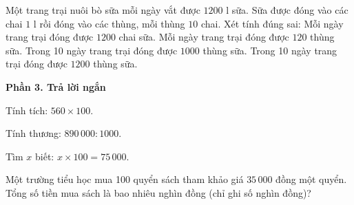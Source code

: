 \begin{ex} %
Một trang trại nuôi bò sữa mỗi ngày vắt được $1200\text{ l}$ sữa. Sữa được đóng vào các chai $1\text{ l}$ rồi đóng vào các thùng, mỗi thùng $10$ chai. Xét tính đúng sai:
\choiceTF
{\True Mỗi ngày trang trại đóng được $1200$ chai sữa.}
{\True Mỗi ngày trang trại đóng được $120$ thùng sữa.}
{Trong 10 ngày trang trại đóng được $1000$ thùng sữa.}
{\True Trong 10 ngày trang trại đóng được $1200$ thùng sữa.}
\end{ex}

\textbf{Phần 3. Trả lời ngắn}

\begin{ex} %
Tính tích: $560 \times 100$.
\end{ex}

\begin{ex} %
Tính thương: $890\,000 : 1000$.
\end{ex}

\begin{ex} %
Tìm $x$ biết: $x \times 100 = 75\,000$.
\end{ex}

\begin{ex} %
Một trường tiểu học mua 100 quyển sách tham khảo giá $35\,000$ đồng một quyển. Tổng số tiền mua sách là bao nhiêu nghìn đồng (chỉ ghi số nghìn đồng)?
\end{ex}

